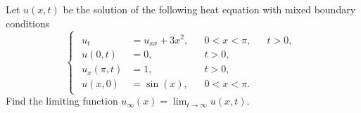 \documentclass[plain]{pset}
\begin{document}
\pagebreak

\begin{problem}
Let \(u(x, t)\) be the solution of the following heat equation with mixed boundary conditions
\[
    \begin{cases}
        \begin{aligned}
            u_t         & = u_{xx} + 3x^2, &  & 0 < x < \pi, &  & t > 0, \\
            u(0, t)     & = 0,             &  & t > 0,                   \\
            u_x(\pi, t) & = 1,             &  & t > 0,                   \\
            u(x, 0)     & = \sin(x),       &  & 0 < x < \pi.
        \end{aligned}
    \end{cases}
\]
Find the limiting function \(u_\infty(x) = \lim_{t \to \infty} u(x, t)\).
\end{problem}
\end{document}
